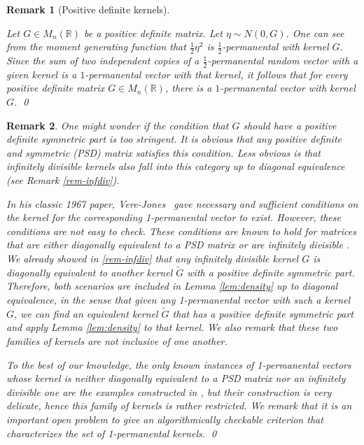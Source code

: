 \documentclass[a4paper, 11pt]{article}
\newtheorem{rem}{Remark}[thm]
\begin{document}
\vspace{.3em} \begin{rem}[Positive definite kernels]
\label{rem:rem-psd-lem:density}

Let $G \in M_n(\mathbb{R})$ be a positive definite matrix. Let $\eta \sim N(0, G)$. One can see from the moment generating function that $\frac{1}{2} \eta^2$ is $\frac{1}{2}$-permanental with kernel $G$. Since the sum of two independent copies of a $\frac{1}{2}$-permanental random vector with a given kernel is a $1$-permanental vector with that kernel, it follows that for every positive definite matrix $G \in M_n(\mathbb{R})$, there is a $1$-permanental vector with kernel $G$. \qed
\end{rem}

{\color{blue}
}

\vspace{.3em} \begin{rem}
One might wonder if the condition
that $G$ should have a positive definite symmetric part is too stringent.
It is obvious that any positive definite and symmetric (PSD) matrix
satisfies this condition. Less obvious is that
infinitely divisible kernels also fall into this category up to diagonal equivalence
(see Remark \cref{rem-infdiv}).

In his classic 1967 paper, Vere-Jones~\cite{verejones97} gave necessary and sufficient conditions
on the kernel for the corresponding 1-permanental vector to exist. However,
these conditions
are not easy to check. These conditions are known to hold for matrices that are either diagonally equivalent to
a PSD matrix or are
infinitely divisible \cite{eisenbaum17}. We already showed in \cref{rem-infdiv} that any infinitely divisible kernel $G$ is diagonally equivalent to another kernel $\tilde{G}$ with a positive definite symmetric part. Therefore, both scenarios are included in Lemma \ref{lem:density} up to diagonal equivalence, in the sense that given any 1-permanental vector with such a kernel $G$, we can find an equivalent kernel $\tilde{G}$ that has a positive definite symmetric part and apply Lemma \ref{lem:density} to that kernel. We also remark that these two families of kernels are not inclusive of one another.

To the best of our knowledge, the only known instances of 1-permanental vectors whose kernel is neither diagonally equivalent to a PSD matrix nor an infinitely divisible one are the examples constructed in \cite[Theorem 7.3]{em17}, but their construction is very delicate, hence this family of kernels is rather restricted.
We remark that it is an important open problem to give an algorithmically checkable criterion that characterizes the set of 1-permanental kernels. \qed
\end{rem}
\end{document}
